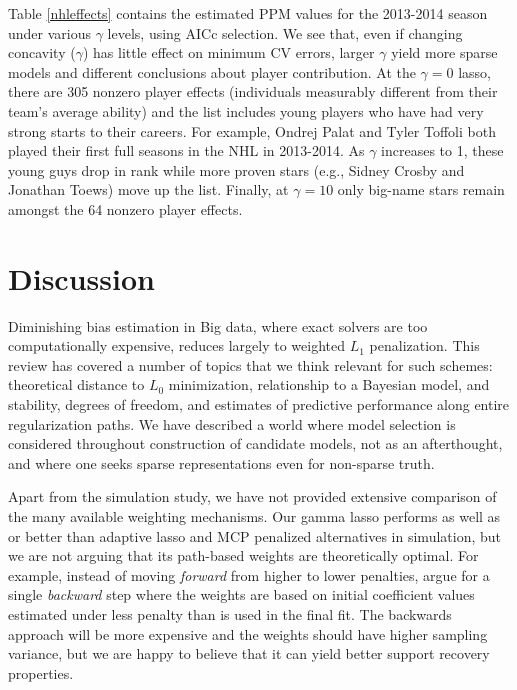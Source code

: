 \documentclass[12pt]{article}
\begin{document}
Table \ref{nhleffects} contains the estimated PPM values for the 2013-2014
season under various $\gamma$ levels, using AICc selection.  We see that, even
if changing concavity ($\gamma$) has little effect on minimum CV errors,
larger $\gamma$  yield more sparse models and different conclusions about
player contribution. At the $\gamma=0$ lasso, there are 305 nonzero player
effects (individuals measurably different from their team's average ability)
and the list includes young players who have had very strong starts to their
careers.  For example, Ondrej Palat and Tyler Toffoli both played their first
full seasons in the NHL in 2013-2014.  As $\gamma$ increases to 1, these young
guys  drop in rank while more proven stars (e.g., Sidney Crosby and Jonathan
Toews) move up the list.  Finally, at $\gamma=10$ only big-name stars remain
amongst the 64 nonzero player effects.

\section{Discussion}
\label{discussion}

Diminishing bias estimation in Big data, where exact solvers are too
computationally expensive, reduces largely to weighted $L_1$ penalization.
This review has covered a number of topics that we think relevant for such
schemes: theoretical distance to $L_0$ minimization, relationship to a
Bayesian model, and stability, degrees of freedom, and estimates of predictive
performance along entire regularization paths. We have described a world where
model selection is considered throughout construction of candidate models, not
as an afterthought, and where one seeks sparse representations even for
non-sparse truth.
 
Apart from the simulation study, we have not provided extensive comparison of
the many available weighting mechanisms. Our gamma lasso performs as well as
or better than adaptive lasso and MCP penalized alternatives in simulation,
but we are not arguing that its path-based weights are theoretically optimal.
For example, instead of moving {\it forward} from higher to lower penalties,
\cite{van_de_geer_adaptive_2011} argue for a single {\it backward} step 
where the weights are based on initial coefficient values estimated under less
penalty than is used in the final fit.  The backwards approach will be more
expensive and the weights should have higher sampling variance, but we are
happy to believe that it can yield better support recovery properties.
\end{document}
